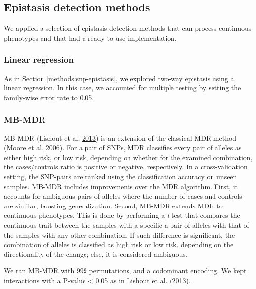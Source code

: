 \documentclass[
  11pt,
]{env/yjiao}
\begin{document}
\hypertarget{methods-methods}{%
\subsection{Epistasis detection methods}\label{methods-methods}}

We applied a selection of epistasis detection methods that can process continuous phenotypes and that had a ready-to-use implementation.

\hypertarget{linear-regression}{%
\subsubsection{Linear regression}\label{linear-regression}}

As in Section \ref{methods:snp-epistasis}, we explored two-way epistasis using a linear regression. In this case, we accounted for multiple testing by setting the family-wise error rate to 0.05.

\hypertarget{mb-mdr}{%
\subsubsection{MB-MDR}\label{mb-mdr}}

MB-MDR (Lishout et al. \protect\hyperlink{ref-lishout_efficient_2013}{2013}) is an extension of the classical MDR method (Moore et al. \protect\hyperlink{ref-moore_flexible_2006}{2006}). For a pair of SNPs, MDR classifies every pair of alleles as either high risk, or low risk, depending on whether for the examined combination, the cases/controls ratio is positive or negative, respectively. In a cross-validation setting, the SNP-pairs are ranked using the classification accuracy on unseen samples. MB-MDR includes improvements over the MDR algorithm. First, it accounts for ambiguous pairs of alleles where the number of cases and controls are similar, boosting generalization. Second, MB-MDR extends MDR to continuous phenotypes. This is done by performing a \emph{t}-test that compares the continuous trait between the samples with a specific a pair of alleles with that of the samples with any other combination. If such difference is significant, the combination of alleles is classified as high risk or low risk, depending on the directionality of the change; else, it is considered ambiguous.

We ran MB-MDR with 999 permutations, and a codominant encoding. We kept interactions with a P-value \textless{} 0.05 as in Lishout et al. (\protect\hyperlink{ref-lishout_efficient_2013}{2013}).
\end{document}
